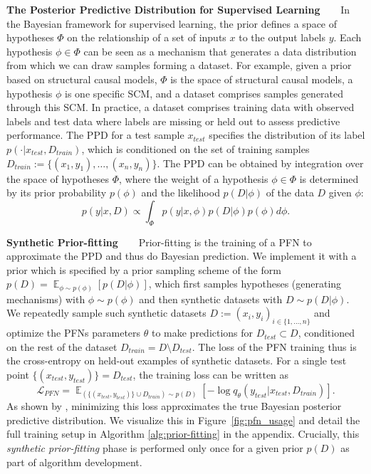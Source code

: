\documentclass{article}
\DeclareMathOperator*{\E}{\mathbb{E}}
\newcommand{\slimparagraph}[1]{\textbf{#1~~~}}
\begin{document}
\slimparagraph{The Posterior Predictive Distribution for Supervised Learning}
In the Bayesian framework for supervised learning, the prior defines a space of hypotheses $\Phi$ on the relationship of a set of inputs $x$ to the output labels $y$.
Each hypothesis $\phi\in\Phi$ can be seen as a mechanism that generates a data distribution from which we can draw samples forming a dataset. For example, given a prior based on structural causal models, $\Phi$ is the space of structural causal models, a hypothesis $\phi$ is one specific SCM, and a dataset comprises samples generated through this SCM. In practice, a dataset comprises training data with observed labels and test data where labels are missing or held out to assess predictive performance.
The PPD for a test sample $x_{test}$ specifies the distribution of its label $p(\cdot|x_{test},D_{train})$, which is conditioned on the set of training samples $D_{train} := \{(x_1,y_1), \dots, (x_n,y_n)\}$.
The PPD can be obtained by integration over the space of hypotheses $\Phi$, where the weight of a hypothesis $\phi\in\Phi$ is determined by its prior probability $p(\phi)$ and the likelihood $p(D|\phi)$ of the data $D$ given $\phi$:
\begin{equation}
    p(y|x,D) \propto \int_{\Phi} p(y|x,\phi) p(D|\phi) p(\phi) d\phi.
    \label{eq:ppd}
\end{equation}

\slimparagraph{Synthetic Prior-fitting} 
Prior-fitting is the training of a PFN to approximate the PPD and thus do Bayesian prediction.
We implement it with a prior which is specified by a prior sampling scheme of the form $p(D)=\E_{\phi \sim p(\phi)}[p(D|\phi)]$, which first samples hypotheses (generating mechanisms) with $\phi \sim p(\phi)$ and then synthetic datasets with $D \sim p(D|\phi)$.
We repeatedly sample such synthetic datasets $D:={(x_i, y_i)}_{i \in \{1,\dots,n\}}$ and optimize the PFN\textquotesingle{}s parameters $\theta$ to make predictions for $D_{test} \subset D$, conditioned on the rest of the dataset $D_{train} = D \setminus D_{test}$.
The loss of the PFN training thus is the cross-entropy on held-out examples of synthetic datasets.
For a single test point $\{(x_{test},y_{test})\} = D_{test}$, the training loss can be written as
\begin{equation}
    \mathcal{L}_{\textit{PFN}} = \E_{(\{(x_{test}, y_{test})\} \cup D_{train}) \sim p(D)} [-\log q_{\theta}(y_{test}|x_{test},D_{train})].
    \label{eq:lpfn}
\end{equation}
As shown by \cite{muller-iclr22a}, minimizing this loss approximates the true Bayesian posterior predictive distribution. We visualize this in Figure~\ref{fig:pfn_usage} and detail the full training setup in Algorithm \ref{alg:prior-fitting} in the appendix.
Crucially, this \textit{synthetic prior-fitting} phase is performed only once for a given prior $p(D)$ as part of algorithm development. 
\end{document}

